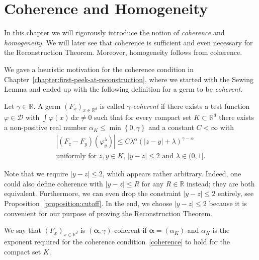 \section{Coherence and Homogeneity}\label{chapter:coherence}

In this chapter we will rigorously introduce the notion of \emph{coherence} and \emph{homogeneity}. We will later see that coherence is sufficient and even necessary for the Reconstruction Theorem. Moreover, homogeneity follows from coherence.

We gave a heuristic motivation for the coherence condition in Chapter~\ref{chapter:first-peek-at-reconstruction}, where we started with the Sewing Lemma and ended up with the following definition for a germ to be \emph{coherent}.

\begin{definition}\label{definition:coherence}
   Let \(\gamma \in \mathbb{R}\). A germ \({(F_x)}_{x \in \mathbb{R}^d}\) is called \emph{\(\gamma\)-coherent} if there exists a test function \(\varphi \in \mathcal{D}\) with \(\int \varphi(x) \, \mathrm{d}x \neq 0\) such that for every compact set \(K \subset \mathbb{R}^d\) there exists a non-positive real number \(\alpha_K \leq \min\left\{ 0, \gamma \right\}\) and a constant \(C < \infty\) with
   \begin{gather}\label{coherence}
        |(F_z - F_y)(\varphi^\lambda_y)| \leq C\lambda^\alpha{(|z-y| + \lambda)}^{\gamma - \alpha}  \\ \text{uniformly for \(z,y \in K\), \(|y-z| \leq 2\)  and \(\lambda \in (0,1]\)} \nonumber. %
   \end{gather}
\end{definition}
\begin{remark}\label{remark:cutoff}
    Note that we require \(|y-z| \leq 2\), which appears rather arbitrary. Indeed, one could also define coherence with \(|y-z| \leq R\) for any \(R \in \mathbb{R}\) instead; they are both equivalent. Furthermore, we can even drop the constraint \(|y-z| \leq 2\) entirely, see Proposition~\ref{proposition:cutoff}. In the end, we choose \(|y-z| \leq 2\) because it is convenient for our purpose of proving the Reconstruction Theorem.
\end{remark}

We say that  \({(F_x)}_{x \in \mathbb{R}^d}\) is \((\bm{\alpha}, \gamma)\)-coherent if \(\bm \alpha = (\alpha_K)\) and \(\alpha_K\) is the exponent required for the coherence condition~\eqref{coherence} to hold for the compact set \(K\). 

